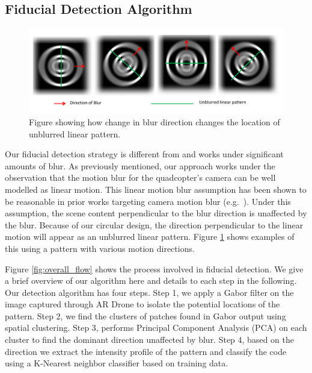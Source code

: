 \documentclass[runningheads]{llncs}
\begin{document}
\subsection{Fiducial Detection Algorithm}

\begin{figure}
\centering
\includegraphics[width=\linewidth]{blur_direction.pdf}
\caption{Figure showing how change in blur direction changes the location of
unblurred linear pattern.}
\label{fig:blur_direction}
\end{figure}

Our fiducial detection strategy is different from \cite{NaimarkF02,Pitag13} and works
under significant amounts of blur.   As previously mentioned, our approach works
under the observation that the motion blur for the quadcopter's camera
can be well modelled as linear motion.  This  linear motion blur assumption has been shown to be
reasonable in prior works targeting camera motion blur (e.g.~\cite{Moshe:2003,Moshe:2004}).
Under this assumption, the scene content perpendicular to the blur direction is
unaffected by the blur.  Because of our circular design, the
direction perpendicular to the linear motion will appear as an unblurred linear
pattern.  Figure \ref{fig:blur_direction} shows examples of this using a
pattern  with various motion directions.

Figure \ref{fig:overall_flow} shows the process involved in fiducial
detection. We give a brief overview of our algorithm here and details
to each step in the following.  Our detection algorithm has four steps. Step 1,
we apply a Gabor filter on the image captured through AR Drone to isolate the
potential locations of the pattern.  Step 2, we find the clusters of patches
found in Gabor output using spatial clustering.  Step 3, performs Principal
Component Analysis (PCA) on each cluster to find the dominant direction
unaffected by blur.  Step 4, based on the direction we extract the intensity
profile of the pattern and classify the code using a K-Nearest neighbor
classifier based on training data.
\end{document}
